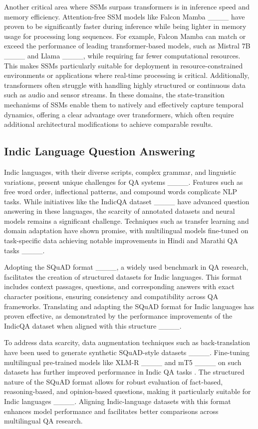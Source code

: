 Another critical area where SSMs surpass transformers is in inference speed and memory efficiency. Attention-free SSM models like Falcon Mamba ____ have proven to be significantly faster during inference while being lighter in memory usage for processing long sequences. For example, Falcon Mamba can match or exceed the performance of leading transformer-based models, such as Mistral 7B ____ and Llama ____, while requiring far fewer computational resources. This makes SSMs particularly suitable for deployment in resource-constrained environments or applications where real-time processing is critical. Additionally, transformers often struggle with handling highly structured or continuous data such as audio and sensor streams. In these domains, the state-transition mechanisms of SSMs enable them to natively and effectively capture temporal dynamics, offering a clear advantage over transformers, which often require additional architectural modifications to achieve comparable results.

\subsection{Indic Language Question Answering}
Indic languages, with their diverse scripts, complex grammar, and linguistic variations, present unique challenges for QA systems ____. Features such as free word order, inflectional patterns, and compound words complicate NLP tasks. While initiatives like the IndicQA dataset ____ have advanced question answering in these languages, the scarcity of annotated datasets and neural models remains a significant challenge. Techniques such as transfer learning and domain adaptation have shown promise, with multilingual models fine-tuned on task-specific data achieving notable improvements in Hindi and Marathi QA tasks ____.

Adopting the SQuAD format ____, a widely used benchmark in QA research, facilitates the creation of structured datasets for Indic languages. This format includes context passages, questions, and corresponding answers with exact character positions, ensuring consistency and compatibility across QA frameworks. Translating and adapting the SQuAD format for Indic languages has proven effective, as demonstrated by the performance improvements of the IndicQA dataset when aligned with this structure ____.

To address data scarcity, data augmentation techniques such as back-translation have been used to generate synthetic SQuAD-style datasets ____. Fine-tuning multilingual pre-trained models like XLM-R ____ and mT5 ____ on such datasets has further improved performance in Indic QA tasks . The structured nature of the SQuAD format allows for robust evaluation of fact-based, reasoning-based, and opinion-based questions, making it particularly suitable for Indic languages ____. Aligning Indic-language datasets with this format enhances model performance and facilitates better comparisons across multilingual QA research.